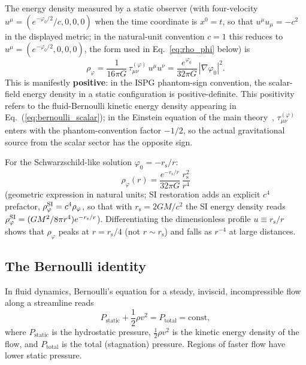\documentclass[aps,prd,onecolumn,superscriptaddress,nofootinbib,showpacs,12pt,notitlepage]{revtex4-2}
\newcommand{\rs}{r_{\mathrm{s}}}
\begin{document}
The energy density measured by a static observer
(with four-velocity $u^\mu = (e^{-\varphi_0/2}/c, 0, 0, 0)$
when the time coordinate is $x^0 = t$, so that
$u^\mu u_\mu = -c^2$ in the displayed metric; in the
natural-unit convention $c = 1$ this reduces to
$u^\mu = (e^{-\varphi_0/2}, 0, 0, 0)$, the form used
in Eq.~\ref{eq:rho_phi} below)
is
\begin{equation}\label{eq:rho_phi}
  \rho_\varphi
  = \frac{1}{16\pi G}\,\tau_{\mu\nu}^{(\varphi)}\,u^\mu u^\nu
  = \frac{e^{\varphi_0}}{32\pi G}\,|\nabla\varphi_0|^{2}.
\end{equation}
This is manifestly \textbf{positive}: in the ISPG phantom-sign
convention, the scalar-field energy density in a static
configuration is positive-definite.  This positivity refers to
the fluid-Bernoulli kinetic energy density appearing in
Eq.~(\ref{eq:bernoulli_scalar}); in the Einstein equation of the
main theory~\cite{Lotishvili2026}, $\tau^{(\varphi)}_{\mu\nu}$
enters with the phantom-convention factor $-1/2$, so the actual
gravitational source from the scalar sector has the opposite sign.

For the Schwarzschild-like solution $\varphi_0 = -\rs/r$:
\begin{equation}\label{eq:rho_schwarz}
  \rho_\varphi(r)
  = \frac{e^{-\rs/r}}{32\pi G}\,\frac{\rs^{2}}{r^{4}}
\end{equation}
(geometric expression in natural units; SI restoration adds an
explicit $c^4$ prefactor, $\rho_\varphi^{\rm SI} = c^4 \rho_\varphi$,
so that with $\rs = 2GM/c^2$ the SI energy density reads
$\rho_\varphi^{\rm SI} = (GM^2/8\pi r^4) e^{-\rs/r}$).
Differentiating the dimensionless profile $u \equiv \rs/r$
shows that $\rho_\varphi$ peaks at $r = \rs/4$ (not $r\sim\rs$)
and falls as $r^{-4}$ at large distances.

\subsection{The Bernoulli identity}
\label{sec:bernoulli_derivation}

In fluid dynamics, Bernoulli's equation for a steady, inviscid,
incompressible flow along a streamline reads
\begin{equation}\label{eq:bernoulli_fluid}
  P_{\mathrm{static}} + \frac{1}{2}\rho v^{2}
  = P_{\mathrm{total}} = \mathrm{const},
\end{equation}
where $P_{\mathrm{static}}$ is the hydrostatic pressure,
$\frac{1}{2}\rho v^2$ is the kinetic energy density of the flow,
and $P_{\mathrm{total}}$ is the total (stagnation) pressure.
Regions of faster flow have lower static pressure.
\end{document}
